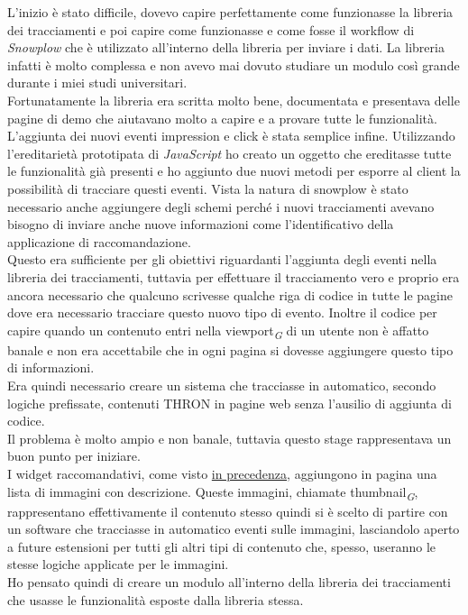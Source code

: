 \documentclass[a4paper, 12pt, twoside, openright]{book}
\newcommand{\gloss}[1]{#1\textsubscript{\textit{\tiny{G}}}}
\begin{document}
L'inizio è stato difficile, dovevo capire perfettamente come funzionasse la libreria dei tracciamenti e poi capire come funzionasse e come fosse il workflow di \textit{Snowplow} che è utilizzato all'interno della libreria per inviare i dati. La libreria infatti è molto complessa e non avevo mai dovuto studiare un modulo così grande durante i miei studi universitari.\\
Fortunatamente la libreria era scritta molto bene, documentata e presentava delle pagine di demo che aiutavano molto a capire e a provare tutte le funzionalità. L'aggiunta dei nuovi eventi impression e click è stata semplice infine. Utilizzando l'ereditarietà prototipata di \textit{JavaScript} ho creato un oggetto che ereditasse tutte le funzionalità già presenti e ho aggiunto due nuovi metodi per esporre al client la possibilità di tracciare questi eventi. Vista la natura di snowplow è stato necessario anche aggiungere degli schemi perché i nuovi tracciamenti avevano bisogno di inviare anche nuove informazioni come l'identificativo della applicazione di raccomandazione.\\
Questo era sufficiente per gli obiettivi riguardanti l'aggiunta degli eventi nella libreria dei tracciamenti, tuttavia per effettuare il tracciamento vero e proprio era ancora necessario che qualcuno scrivesse qualche riga di codice in tutte le pagine dove era necessario tracciare questo nuovo tipo di evento. Inoltre il codice per capire quando un contenuto entri nella \gloss{viewport} di un utente non è affatto banale e non era accettabile che in ogni pagina si dovesse aggiungere questo tipo di informazioni.\\

Era quindi necessario creare un sistema che tracciasse in automatico, secondo logiche prefissate, contenuti THRON in pagine web senza l'ausilio di aggiunta di codice.\\
Il problema è molto ampio e non banale, tuttavia questo stage rappresentava un buon punto per iniziare.\\
I widget raccomandativi, come visto \hyperref[pcr-example]{in precedenza}, aggiungono in pagina una lista di immagini con descrizione. Queste immagini, chiamate \gloss{thumbnail}, rappresentano effettivamente il contenuto stesso quindi si è scelto di partire con un software che tracciasse in automatico eventi sulle immagini, lasciandolo aperto a future estensioni per tutti gli altri tipi di contenuto che, spesso, useranno le stesse logiche applicate per le immagini.\\
Ho pensato quindi di creare un modulo all'interno della libreria dei tracciamenti che usasse le funzionalità esposte dalla libreria stessa.\\
\end{document}
